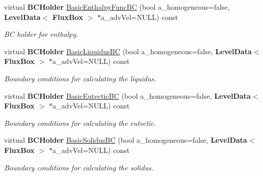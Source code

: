 \begin{DoxyCompactItemize}
\mbox{\label{class_phys_b_c_util_a2738b6b86dd806cbef3555c63c16654f}} 
virtual \textbf{ B\+C\+Holder} \hyperlink{class_phys_b_c_util_a2738b6b86dd806cbef3555c63c16654f}{Basic\+Enthalpy\+Func\+BC} (bool a\+\_\+homogeneous=false, \textbf{ Level\+Data}$<$ \textbf{ Flux\+Box} $>$ $\ast$a\+\_\+adv\+Vel=N\+U\+LL) const
\begin{DoxyCompactList}\small\item\em BC holder for enthalpy. \end{DoxyCompactList}\item 
\mbox{\label{class_phys_b_c_util_a18c7c929e037f3502664c8187a1773be}} 
virtual \textbf{ B\+C\+Holder} \hyperlink{class_phys_b_c_util_a18c7c929e037f3502664c8187a1773be}{Basic\+Liquidus\+BC} (bool a\+\_\+homogeneous=false, \textbf{ Level\+Data}$<$ \textbf{ Flux\+Box} $>$ $\ast$a\+\_\+adv\+Vel=N\+U\+LL) const
\begin{DoxyCompactList}\small\item\em Boundary conditions for calculating the liquidus. \end{DoxyCompactList}\item 
\mbox{\label{class_phys_b_c_util_a6053b911815dee529e0c03b9a1890ac6}} 
virtual \textbf{ B\+C\+Holder} \hyperlink{class_phys_b_c_util_a6053b911815dee529e0c03b9a1890ac6}{Basic\+Eutectic\+BC} (bool a\+\_\+homogeneous=false, \textbf{ Level\+Data}$<$ \textbf{ Flux\+Box} $>$ $\ast$a\+\_\+adv\+Vel=N\+U\+LL) const
\begin{DoxyCompactList}\small\item\em Boundary conditions for calculating the eutectic. \end{DoxyCompactList}\item 
\mbox{\label{class_phys_b_c_util_a40e62cc352e404c143fd521693351cfe}} 
virtual \textbf{ B\+C\+Holder} \hyperlink{class_phys_b_c_util_a40e62cc352e404c143fd521693351cfe}{Basic\+Solidus\+BC} (bool a\+\_\+homogeneous=false, \textbf{ Level\+Data}$<$ \textbf{ Flux\+Box} $>$ $\ast$a\+\_\+adv\+Vel=N\+U\+LL) const
\begin{DoxyCompactList}\small\item\em Boundary conditions for calculating the solidus. \end{DoxyCompactList}\item 
\mbox{\label{class_phys_b_c_util_aa43f9e82b9b11975d7667ce08cfff8ba}} 

\end{DoxyCompactItemize}
